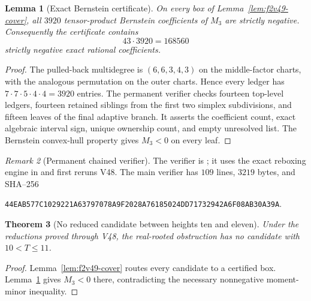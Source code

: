 \documentclass[11pt]{article}
\newtheorem{theorem}{Theorem}[section]
\newtheorem{lemma}[theorem]{Lemma}
\theoremstyle{definition}
\theoremstyle{remark}
\newtheorem{remark}[theorem]{Remark}
\begin{document}
\begin{lemma}[Exact Bernstein certificate]
\label{lem:f2v49-ledger}
On every box of Lemma~\ref{lem:f2v49-cover}, all \(3920\)
tensor-product Bernstein coefficients of \(M_3\) are strictly negative.
Consequently the certificate contains
\begin{equation}
 43\cdot3920=168560
 \label{eq:f2v49-total}
\end{equation}
strictly negative exact rational coefficients.
\end{lemma}

\begin{proof}
The pulled-back multidegree is \((6,6,3,4,3)\) on the middle-factor
charts, with the analogous permutation on the outer charts.  Hence every
ledger has \(7\cdot7\cdot5\cdot4\cdot4=3920\) entries.  The permanent
verifier checks fourteen top-level ledgers, fourteen retained siblings
from the first two simplex subdivisions, and fifteen leaves of the final
adaptive branch.  It asserts the coefficient count, exact algebraic
interval sign, unique ownership count, and empty unresolved list.  The
Bernstein convex-hull property gives \(M_3<0\) on every leaf.
\end{proof}

\begin{remark}[Permanent chained verifier]
\label{rem:f2v49-verifier}
The verifier is
; it uses the
exact reboxing engine in
 and first
reruns V48.  The main verifier has \(109\) lines, \(3219\) bytes, and
SHA--256
\begin{center}
\texttt{44EAB577C1029221A63797078A9F2028A76185024DD71732942A6F08AB30A39A}.
\end{center}
\end{remark}

\begin{theorem}[No reduced candidate between heights ten and eleven]
\label{thm:f2v49-ten-eleven}
Under the reductions proved through V48, the real-rooted obstruction has
no candidate with \(10<T\le11\).
\end{theorem}

\begin{proof}
Lemma~\ref{lem:f2v49-cover} routes every candidate to a certified box.
Lemma~\ref{lem:f2v49-ledger} gives \(M_3<0\) there, contradicting the
necessary nonnegative moment-minor inequality.
\end{proof}
\end{document}
